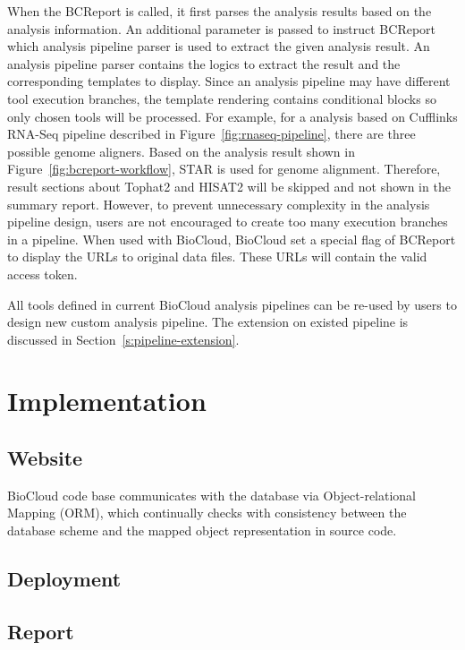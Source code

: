 When the BCReport is called, it first parses the analysis results based on the
analysis information. An additional parameter is passed to instruct BCReport
which analysis pipeline parser is used to extract the given analysis result. An
analysis pipeline parser contains the logics to extract the result and the
corresponding templates to display. Since an analysis pipeline may have
different tool execution branches, the template rendering contains conditional
blocks so only chosen tools will be processed. For example, for a analysis
based on Cufflinks RNA-Seq pipeline described in
Figure~\ref{fig:rnaseq-pipeline}, there are three possible genome aligners.
Based on the analysis result shown in Figure~\ref{fig:bcreport-workflow}, STAR
is used for genome alignment. Therefore, result sections about Tophat2 and
HISAT2 will be skipped and not shown in the summary report. However, to prevent
unnecessary complexity in the analysis pipeline design, users are not
encouraged to create too many execution branches in a pipeline. When used with
BioCloud, BioCloud set a special flag of BCReport to display the URLs to
original data files. These URLs will contain the valid access token.

All tools defined in current BioCloud analysis pipelines can be re-used by
users to design new custom analysis pipeline. The extension on existed pipeline
is discussed in Section~\ref{s:pipeline-extension}.


\section{Implementation}

\subsection{Website}




BioCloud code base communicates with the database via Object-relational Mapping
(ORM), which continually checks with consistency between the database scheme
and the mapped object representation in source code.



\subsection{Deployment}


\subsection{Report}


